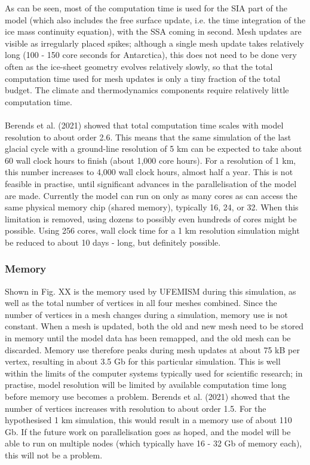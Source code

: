 \documentclass{article}
\begin{document}
As can be seen, most of the computation time is used for the SIA part of the model (which also includes the free surface update, i.e. the time integration of the ice mass continuity equation), with the SSA coming in second. Mesh updates are visible as irregularly placed spikes; although a single mesh update takes relatively long (100 - 150 core seconds for Antarctica), this does not need to be done very often as the ice-sheet geometry evolves relatively slowly, so that the total computation time used for mesh updates is only a tiny fraction of the total budget. The climate and thermodynamics components require relatively little computation time.\\
\\
Berends et al. (2021) showed that total computation time scales with model resolution to about order 2.6. This means that the same simulation of the last glacial cycle with a ground-line resolution of 5 km can be expected to take about 60 wall clock hours to finish (about 1,000 core hours). For a resolution of 1 km, this number increases to 4,000 wall clock hours, almost half a year. This is not feasible in practise, until significant advances in the parallelisation of the model are made. Currently the model can run on only as many cores as can access the same physical memory chip (shared memory), typically 16, 24, or 32. When this limitation is removed, using dozens to possibly even hundreds of cores might be possible. Using 256 cores, wall clock time for a 1 km resolution simulation might be reduced to about 10 days - long, but definitely possible.

\subsubsection{Memory}

Shown in Fig. XX is the memory used by UFEMISM during this simulation, as well as the total number of vertices in all four meshes combined. Since the number of vertices in a mesh changes during a simulation, memory use is not constant. When a mesh is updated, both the old and new mesh need to be stored in memory until the model data has been remapped, and the old mesh can be discarded. Memory use therefore peaks during mesh updates at about 75 kB per vertex, resulting in about 3.5 Gb for this particular simulation.  This is well within the limits of the computer systems typically used for scientific research; in practise, model resolution will be limited by available computation time long before memory use becomes a problem. Berends et al. (2021) showed that the number of vertices increases with resolution to about order 1.5. For the hypothesised 1 km simulation, this would result in a memory use of about 110 Gb. If the future work on parallelisation goes as hoped, and the model will be able to run on multiple nodes (which typically have 16 - 32 Gb of memory each), this will not be a problem.
\end{document}
